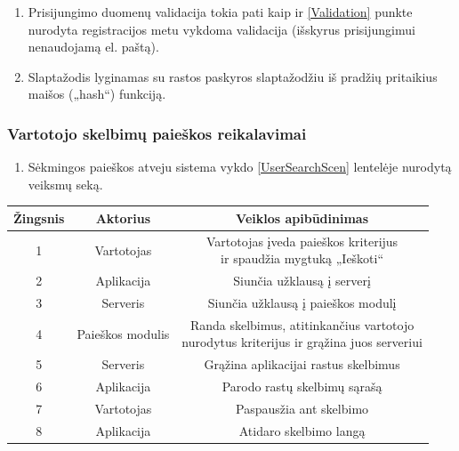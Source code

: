 \documentclass[12pt]{article}
\begin{document}
	\begin{enumerate}[resume, labelindent=10pt,leftmargin=2.2cm]
		\item Prisijungimo duomenų validacija tokia pati kaip ir \ref{Validation} punkte nurodyta registracijos metu vykdoma validacija (išskyrus prisijungimui nenaudojamą el. paštą).
		\item Slaptažodis lyginamas su rastos paskyros slaptažodžiu iš pradžių pritaikius maišos („hash“) funkciją.
	\end{enumerate}
	\pagebreak
	
	\subsubsection{Vartotojo skelbimų paieškos reikalavimai}
	\begin{enumerate}[labelindent=10pt,leftmargin=2.2cm]
		\item Sėkmingos paieškos atveju sistema vykdo \ref{UserSearchScen} lentelėje nurodytą veiksmų seką.
	\end{enumerate}
		
		\begin{center}
		\begin{tabular}{ | c | c | c | }
			\hline
			Žingsnis & Aktorius     & Veiklos apibūdinimas \\ \hline
			1        & Vartotojas   & \makecell{Vartotojas įveda paieškos kriterijus \\ ir spaudžia mygtuką „Ieškoti“} \\ \hline
			2        & Aplikacija   & Siunčia užklausą į serverį \\ \hline
			3        & Serveris     & Siunčia užklausą į paieškos modulį \\ \hline
			4        & Paieškos modulis & \makecell{Randa skelbimus, atitinkančius vartotojo \\ nurodytus kriterijus ir grąžina juos serveriui} \\ \hline
			5        & Serveris     & Grąžina aplikacijai rastus skelbimus  \\ \hline
			6        & Aplikacija   & Parodo rastų skelbimų sąrašą \\ \hline
			7        & Vartotojas   & Paspausžia ant skelbimo \\ \hline
			8        & Aplikacija   & Atidaro skelbimo langą \\ \hline
		\end{tabular}
		\end{center}
		\bigskip
\end{document}

